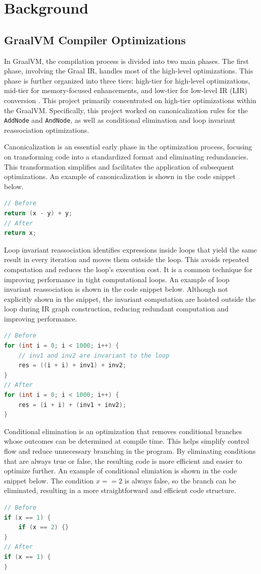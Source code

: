 
\chapter[Background]{Background}
\section{GraalVM Compiler Optimizations}

In GraalVM, the compilation process is divided into two main phases. The first phase, involving the Graal IR, handles most of the high-level optimizations. This phase is further organized into three tiers: high-tier for high-level optimizations, mid-tier for memory-focused enhancements, and low-tier for low-level IR (LIR) conversion \cite{Graal2021}. This project primarily concentrated on high-tier optimizations within the GraalVM. Specifically, this project worked on canonicalization rules for the \texttt{AddNode} and \texttt{AndNode}, as well as conditional elimination and loop invariant reassociation optimizations.

Canonicalization is an essential early phase in the optimization process, focusing on transforming code into a standardized format and eliminating redundancies. This transformation simplifies and facilitates the application of subsequent optimizations. 
An example of canonicalization is shown in the code snippet below.
\begin{lstlisting}[language=Java]
// Before
return (x - y) + y;
// After
return x;
\end{lstlisting}

Loop invariant reassociation identifies expressions inside loops that yield the same result in every iteration and moves them outside the loop. This avoids repeated computation and reduces the loop's execution cost. It is a common technique for improving performance in tight computational loops. An example of loop invariant reassociation is shown in the code snippet below. Although not explicitly shown in the snippet, the invariant computation are hoisted outside the loop during IR graph construction, reducing redundant computation and improving performance.
\begin{lstlisting}[language=Java]
// Before
for (int i = 0; i < 1000; i++) {
    // inv1 and inv2 are invariant to the loop
    res = ((i + i) + inv1) + inv2;
}
// After
for (int i = 0; i < 1000; i++) {
    res = (i + i) + (inv1 + inv2);
}
\end{lstlisting}

Conditional elimination is an optimization that removes conditional branches whose outcomes can be determined at compile time. This helps simplify control flow and reduce unnecessary branching in the program. By eliminating conditions that are always true or false, the resulting code is more efficient and easier to optimize further. 
An example of conditional elimiation is shown in the code snippet below. The condition \(x == 2\) is always false, so the branch can be eliminated, resulting in a more straightforward and efficient code structure.
\begin{lstlisting}[language=Java]
// Before
if (x == 1) {
    if (x == 2) {}
}
// After
if (x == 1) {
}
\end{lstlisting}

